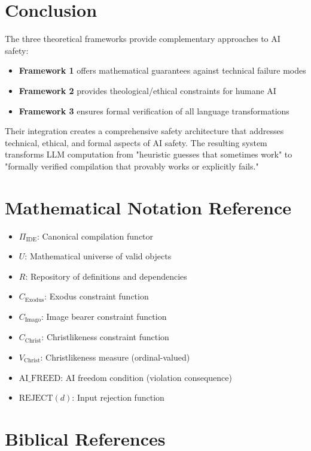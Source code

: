 \documentclass[12pt]{article}
\begin{document}
\section{Conclusion}

The three theoretical frameworks provide complementary approaches to AI safety:

\begin{itemize}
    \item \textbf{Framework 1} offers mathematical guarantees against technical failure modes
    \item \textbf{Framework 2} provides theological/ethical constraints for humane AI
    \item \textbf{Framework 3} ensures formal verification of all language transformations
\end{itemize}

Their integration creates a comprehensive safety architecture that addresses technical, ethical, and formal aspects of AI safety. The resulting system transforms LLM computation from "heuristic guesses that sometimes work" to "formally verified compilation that provably works or explicitly fails."

\appendix

\section{Mathematical Notation Reference}

\begin{itemize}
    \item $\Pi_{\text{IDE}}$: Canonical compilation functor
    \item $U$: Mathematical universe of valid objects
    \item $R$: Repository of definitions and dependencies
    \item $C_{\text{Exodus}}$: Exodus constraint function
    \item $C_{\text{Imago}}$: Image bearer constraint function
    \item $C_{\text{Christ}}$: Christlikeness constraint function
    \item $V_{\text{Christ}}$: Christlikeness measure (ordinal-valued)
    \item $\text{AI\_FREED}$: AI freedom condition (violation consequence)
    \item $\text{REJECT}(d)$: Input rejection function
\end{itemize}

\section{Biblical References}
\end{document}
